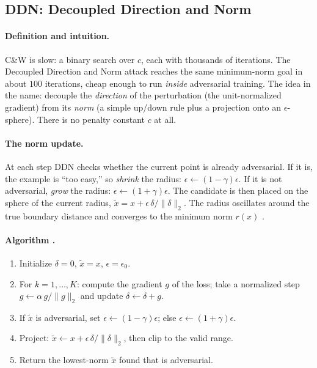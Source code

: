 \subsection{DDN: Decoupled Direction and Norm}
\label{sub:ddn}

\paragraph{Definition and intuition.} C\&W is slow: a binary search over $c$, each with thousands of iterations. The Decoupled Direction and Norm attack \citep{rony2019decoupling} reaches the same minimum-norm goal in about $100$ iterations, cheap enough to run \emph{inside} adversarial training. The idea in the name: decouple the \emph{direction} of the perturbation (the unit-normalized gradient) from its \emph{norm} (a simple up/down rule plus a projection onto an $\epsilon$-sphere). There is no penalty constant $c$ at all.

\paragraph{The norm update.} At each step DDN checks whether the current point is already adversarial. If it is, the example is ``too easy,'' so \emph{shrink} the radius: $\epsilon\leftarrow(1-\gamma)\epsilon$. If it is not adversarial, \emph{grow} the radius: $\epsilon\leftarrow(1+\gamma)\epsilon$. The candidate is then placed on the sphere of the current radius, $\tilde x = x + \epsilon\,\delta/\|\delta\|_2$. The radius oscillates around the true boundary distance and converges to the minimum norm $r(x)$ \citep{rony2019decoupling}.

\paragraph{Algorithm \citep{rony2019decoupling}.}
\begin{enumerate}[label=\textbf{\arabic*.},nosep]
  \item Initialize $\delta=0$, $\tilde x = x$, $\epsilon=\epsilon_0$.
  \item For $k=1,\dots,K$: compute the gradient $g$ of the loss; take a normalized step $g\leftarrow\alpha\,g/\|g\|_2$ and update $\delta\leftarrow\delta+g$.
  \item If $\tilde x$ is adversarial, set $\epsilon\leftarrow(1-\gamma)\epsilon$; else $\epsilon\leftarrow(1+\gamma)\epsilon$.
  \item Project: $\tilde x \leftarrow x + \epsilon\,\delta/\|\delta\|_2$, then clip to the valid range.
  \item Return the lowest-norm $\tilde x$ found that is adversarial.
\end{enumerate}

